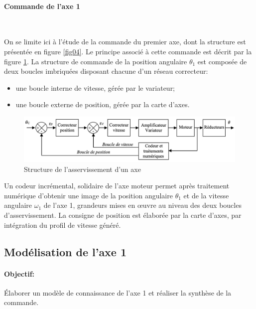 \paragraph{Commande de l'axe 1} ~\

On se limite ici à l'étude de la commande du premier axe, dont la structure est présentée en figure \ref{fig04}. Le principe associé à cette commande est décrit par la figure \ref{fig13}. La structure de commande de la position angulaire $\theta_1$ est composée de deux boucles imbriquées disposant chacune d'un réseau correcteur:
\begin{itemize}
 \item une boucle interne de vitesse, gérée par le variateur;
 \item une boucle externe de position, gérée par la carte d'axes.
\end{itemize}

\begin{figure}[ht!]
\begin{center}
 \includegraphics[width=0.9\linewidth]{img/fig13}
\end{center}
\caption{Structure de l'asservissement d'un axe}
\label{fig13}
\end{figure}

Un codeur incrémental, solidaire de l'axe moteur permet après traitement numérique d'obtenir une image de la position angulaire $\theta_1$ et de la vitesse angulaire $\omega_1$ de l'axe 1, grandeurs mises en \oe uvre au niveau des deux boucles d'asservissement. La consigne de position est élaborée par la carte d'axes, par intégration du profil de vitesse généré.

\newpage

\subsection{Modélisation de l'axe 1}

\paragraph{Objectif:} Élaborer un modèle de connaissance de l'axe 1 et réaliser la synthèse de la commande.


